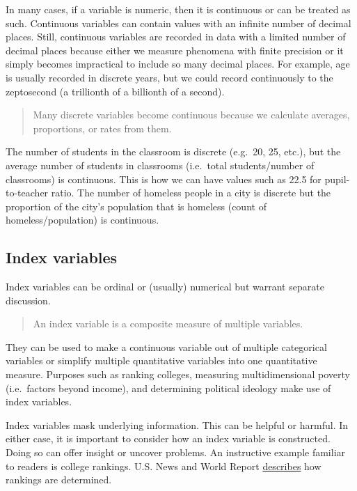 \documentclass[
]{book}
\begin{document}
In many cases, if a variable is numeric, then it is continuous or can be treated as such. Continuous variables can contain values with an infinite number of decimal places. Still, continuous variables are recorded in data with a limited number of decimal places because either we measure phenomena with finite precision or it simply becomes impractical to include so many decimal places. For example, age is usually recorded in discrete years, but we could record continuously to the zeptosecond (a trillionth of a billionth of a second).

\begin{quote}
Many discrete variables become continuous because we calculate averages, proportions, or rates from them.
\end{quote}

The number of students in the classroom is discrete (e.g.~20, 25, etc.), but the average number of students in classrooms (i.e.~total students/number of classrooms) is continuous. This is how we can have values such as 22.5 for pupil-to-teacher ratio. The number of homeless people in a city is discrete but the proportion of the city's population that is homeless (count of homeless/population) is continuous.

\hypertarget{index-variables}{%
\subsection{Index variables}\label{index-variables}}

Index variables can be ordinal or (usually) numerical but warrant separate discussion.

\begin{quote}
An index variable is a composite measure of multiple variables.
\end{quote}

They can be used to make a continuous variable out of multiple categorical variables or simplify multiple quantitative variables into one quantitative measure. Purposes such as ranking colleges, measuring multidimensional poverty (i.e.~factors beyond income), and determining political ideology make use of index variables.

Index variables mask underlying information. This can be helpful or harmful. In either case, it is important to consider how an index variable is constructed. Doing so can offer insight or uncover problems. An instructive example familiar to readers is college rankings. U.S. News and World Report \href{https://www.usnews.com/education/best-colleges/articles/ranking-criteria-and-weights}{describes} how rankings are determined.
\end{document}
